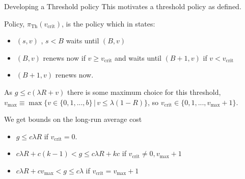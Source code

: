 \documentclass[10pt]{beamer}
\begin{document}
\begin{frame}{Developing a Threshold policy}
This motivates a threshold policy as defined.
\begin{definition}
Policy, $\pi_{\text{Th}}(v_{\text{crit}})$, is the policy which in states:
\begin{itemize}
\item $(s,v)$ , $s < B$ waits until $(B,v)$
\item $(B,v)$ renews now if $v \geq v_{\text{crit}}$ and waits until $(B+1,v)$ if $v < v_{\text{crit}}$
\item $(B+1,v)$ renews now.
\end{itemize}
\end{definition}

As $g \leq c(\lambda R + v)$ there is some maximum choice for this threshold, $v_{\text{max}} \equiv \max \{ v \in \{0,1,...,b \} \, | \, v \leq \lambda (1-R) \} $, so $v_{\text{crit}} \in \{0,1,...,v_{\text{max}}+1 \}$.

We get bounds on the long-run average cost
\begin{itemize}
\item $g \leq c \lambda R$ if $v_{\text{crit}}=0$.

\item $c \lambda R +c(k-1) < g \leq c \lambda R + kc$ if $v_{\text{crit}} \neq 0,v_{\text{max}}+1$

\item $c \lambda R + c v_{\text{max}} < g \leq c \lambda$ if $v_{\text{crit}}=v_{\text{max}}+1$
\end{itemize}

\end{frame}
\end{document}
